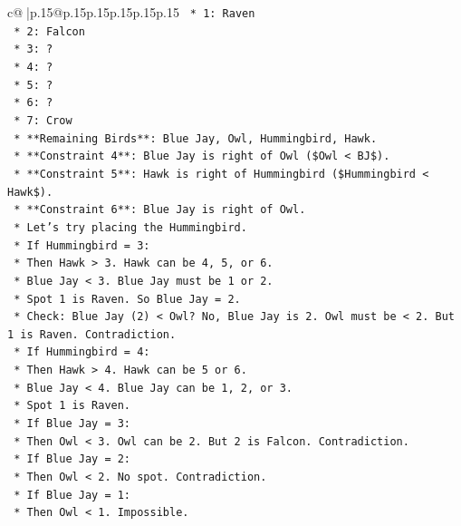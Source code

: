 \documentclass{article}
\begin{document}
{\begin{supertabular}{c@{$\;$}|p{.15\linewidth}@{}p{.15\linewidth}p{.15\linewidth}p{.15\linewidth}p{.15\linewidth}p{.15\linewidth}}
{{{\texttt{        *   1: Raven} \\
\texttt{        *   2: Falcon} \\
\texttt{        *   3: ?} \\
\texttt{        *   4: ?} \\
\texttt{        *   5: ?} \\
\texttt{        *   6: ?} \\
\texttt{        *   7: Crow} \\
\texttt{    *   **Remaining Birds**: Blue Jay, Owl, Hummingbird, Hawk.} \\
\texttt{    *   **Constraint 4**: Blue Jay is right of Owl (\$Owl < BJ\$).} \\
\texttt{    *   **Constraint 5**: Hawk is right of Hummingbird (\$Hummingbird < Hawk\$).} \\
\texttt{    *   **Constraint 6**: Blue Jay is right of Owl.} \\
\texttt{    *   Let's try placing the Hummingbird.} \\
\texttt{        *   If Hummingbird = 3:} \\
\texttt{            *   Then Hawk > 3. Hawk can be 4, 5, or 6.} \\
\texttt{            *   Blue Jay < 3. Blue Jay must be 1 or 2.} \\
\texttt{            *   Spot 1 is Raven. So Blue Jay = 2.} \\
\texttt{            *   Check: Blue Jay (2) < Owl? No, Blue Jay is 2. Owl must be < 2. But 1 is Raven. Contradiction.} \\
\texttt{        *   If Hummingbird = 4:} \\
\texttt{            *   Then Hawk > 4. Hawk can be 5 or 6.} \\
\texttt{            *   Blue Jay < 4. Blue Jay can be 1, 2, or 3.} \\
\texttt{            *   Spot 1 is Raven.} \\
\texttt{            *   If Blue Jay = 3:} \\
\texttt{                *   Then Owl < 3. Owl can be 2. But 2 is Falcon. Contradiction.} \\
\texttt{            *   If Blue Jay = 2:} \\
\texttt{                *   Then Owl < 2. No spot. Contradiction.} \\
\texttt{            *   If Blue Jay = 1:} \\
\texttt{                *   Then Owl < 1. Impossible.} \\
}}}
\end{supertabular}}
\end{document}
